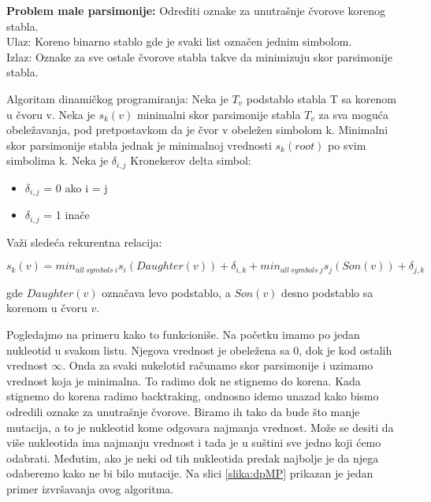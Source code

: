 \begin{tcolorbox}
\textbf{Problem male parsimonije:} Odrediti oznake za unutra\v{s}nje \v{c}vorove korenog stabla. \\
Ulaz: Koreno binarno stablo gde je svaki list ozna\v{c}en jednim simbolom.\\
Izlaz: Oznake za sve ostale \v{c}vorove stabla takve da minimizuju skor parsimonije stabla.
\end{tcolorbox}


Algoritam dinami\v{c}kog programiranja: Neka je $T_v$ podstablo stabla T sa korenom u \v{c}voru v. Neka je $s_k(v)$ minimalni skor parsimonije stabla $T_v$ za sva mogu\'ca obele\v{z}avanja, pod pretpostavkom da je \v{c}vor v obele\v{z}en simbolom k. Minimalni skor parsimonije stabla jednak je minimalnoj vrednosti $s_k(root)$ po svim simbolima k. Neka je \textit{$\delta_{i, j}$} Kronekerov delta simbol:
\begin{itemize}
\item \textit{$\delta_{i, j}$} = 0 ako i = j
\item \textit{$\delta_{i, j}$} = 1 ina\v{c}e
\end{itemize}
Va\v{z}i slede\'ca rekurentna relacija:

$$s_k(v) = min_{all\ symbols\ i} {s_i(Daughter(v)) + \delta_{i,k}} + min_{all\ symbols\ j} {s_j(Son(v)) + \delta_{j,k}}$$

\noindent gde $Daughter(v)$ označava levo podstablo, a $Son(v)$ desno podstablo sa korenom u čvoru $v$. 

Pogledajmo na primeru kako to funkcioniše. Na početku imamo po jedan nukleotid u svakom listu. Njegova vrednost je obeležena sa 0, dok je kod ostalih vrednost $\infty$. Onda za svaki nukelotid računamo skor parsimonije i uzimamo vrednost koja je minimalna. To radimo dok ne stignemo do korena. Kada stignemo do korena radimo backtraking, ondnosno idemo unazad kako bismo odredili oznake za unutrašnje čvorove. Biramo ih tako da bude što manje mutacija, a to je nukleotid kome odgovara najmanja vrednost. Može se desiti da više nukleotida ima najmanju vrednost i tada je u suštini sve jedno koji ćemo odabrati. Međutim, ako je neki od tih nukleotida predak najbolje je da njega odaberemo kako ne bi bilo mutacije. Na slici \ref{slika:dpMP} prikazan je jedan primer izvršavanja ovog algoritma.


